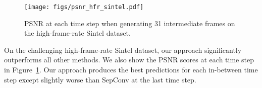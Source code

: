 \documentclass[10pt,twocolumn,letterpaper]{article}
\begin{document}
\begin{figure}
\centering
\setlength{\belowcaptionskip}{-10pt}
\texttt{[image: figs/psnr\_hfr\_sintel.pdf]}
\caption{PSNR at each time step when generating 31 intermediate frames on the high-frame-rate Sintel dataset.}
\label{fig:psnr_hfr_sintel}
\end{figure}

On the challenging high-frame-rate Sintel dataset, our approach significantly outperforms all other methods. We also show the PSNR scores at each time step in Figure~\ref{fig:psnr_hfr_sintel}. Our approach produces the best predictions for each in-between time step except slightly worse than SepConv at the last time step.

\end{document}

